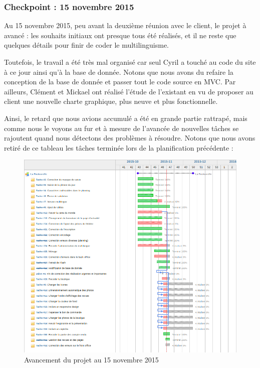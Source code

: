 \documentclass[11pt]{report}
\begin{document}
\subsubsection*{Checkpoint : 15 novembre 2015}
\par Au 15 novembre 2015, peu avant la deuxième réunion avec le client, le
projet à avancé : les souhaits initiaux ont presque tous été réalisés, et il ne 
reste que
quelques détails pour finir de coder le multilinguisme. \\
\par Toutefois, le travail a été très mal organisé car seul Cyril a touché au
code du site à ce jour ainsi qu'à la base de donnée. Notons que nous avons du
refaire la conception de la base de donnée et passer tout le code source en MVC. 
Par
ailleurs, Clément et Mickael ont réalisé l'étude de l'existant en vu de proposer
au client une nouvelle charte graphique, plus neuve et plus fonctionnelle. \\
\par Ainsi, le retard que nous avions accumulé a été en grande partie rattrapé,
mais comme nous le voyons au fur et à mesure de l'avancée de nouvelles tâches se
rajoutent quand nous détectons des problèmes à résoudre. Notons que nous avons
retiré de ce tableau les tâches terminée lors de la planification précédente :

\begin{landscape}
\begin{figure}[t]
    \caption{Avancement du projet au 15 novembre 2015}
   \includegraphics[scale=0.5]{include/gantt15-11.png}
\end{figure}
\end{landscape}
\end{document}
